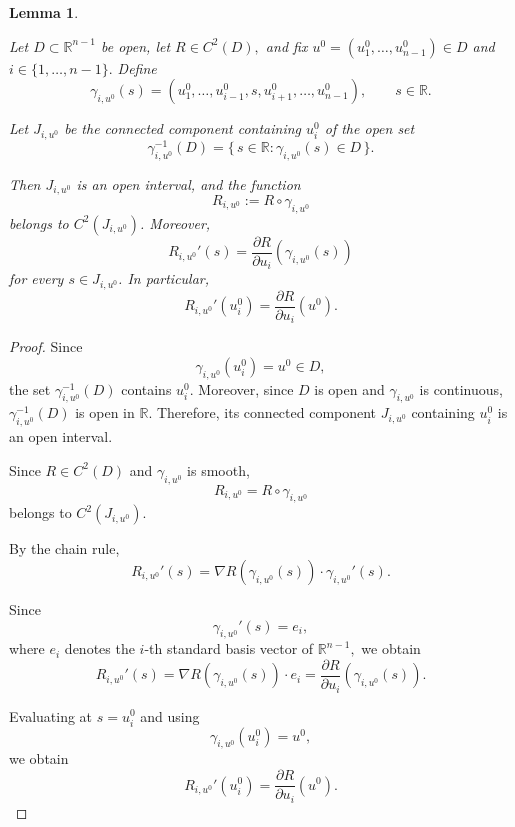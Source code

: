 \documentclass[10pt,a4paper]{amsart}
\newtheorem{lemma}{Lemma}
\begin{document}
\begin{lemma}
\label{lem:coordinate-lines}

Let
\(
D\subset\mathbb R^{n-1}
\)
be open, let
\(
R\in C^2(D),
\)
and fix
\(
u^0=(u_1^0,\ldots,u_{n-1}^0)\in D
\)
and
\(
i\in\{1,\ldots,n-1\}.
\)
Define
\[
\gamma_{i,u^0}(s)
=
(u_1^0,\ldots,u_{i-1}^0,s,
u_{i+1}^0,\ldots,u_{n-1}^0),
\qquad s\in\mathbb R.
\]

Let \(J_{i,u^0}\) be the connected component containing \(u_i^0\) of
the open set
\[
\gamma_{i,u^0}^{-1}(D)
=
\{\,s\in\mathbb R:\gamma_{i,u^0}(s)\in D\,\}.
\]

Then \(J_{i,u^0}\) is an open interval, and the function
\[
R_{i,u^0}
:=
R\circ\gamma_{i,u^0}
\]
belongs to \(C^2(J_{i,u^0})\). Moreover,
\[
R_{i,u^0}'(s)
=
\frac{\partial R}{\partial u_i}
\left(
\gamma_{i,u^0}(s)
\right)
\]
for every \(s\in J_{i,u^0}\). In particular,
\[
R_{i,u^0}'(u_i^0)
=
\frac{\partial R}{\partial u_i}(u^0).
\]

\end{lemma}

\begin{proof}

Since
\[
\gamma_{i,u^0}(u_i^0)=u^0\in D,
\]
the set
\(
\gamma_{i,u^0}^{-1}(D)
\)
contains \(u_i^0\). Moreover, since \(D\) is open and
\(\gamma_{i,u^0}\) is continuous,
\(
\gamma_{i,u^0}^{-1}(D)
\)
is open in \(\mathbb R\). Therefore, its connected component
\(J_{i,u^0}\) containing \(u_i^0\) is an open interval.

Since
\(
R\in C^2(D)
\)
and
\(
\gamma_{i,u^0}
\)
is smooth,
\[
R_{i,u^0}
=
R\circ\gamma_{i,u^0}
\]
belongs to
\(
C^2(J_{i,u^0}).
\)

By the chain rule,
\[
R_{i,u^0}'(s)
=
\nabla R\!\left(\gamma_{i,u^0}(s)\right)\cdot
\gamma_{i,u^0}'(s).
\]

Since
\[
\gamma_{i,u^0}'(s)=e_i,
\]
where
\(
e_i
\)
denotes the \(i\)-th standard basis vector of
\(
\mathbb R^{n-1},
\)
we obtain
\[
R_{i,u^0}'(s)
=
\nabla R\!\left(\gamma_{i,u^0}(s)\right)\cdot e_i
=
\frac{\partial R}{\partial u_i}
\left(
\gamma_{i,u^0}(s)
\right).
\]

Evaluating at
\(
s=u_i^0
\)
and using
\[
\gamma_{i,u^0}(u_i^0)=u^0,
\]
we obtain
\[
R_{i,u^0}'(u_i^0)
=
\frac{\partial R}{\partial u_i}(u^0).
\]

\end{proof}
\end{document}
